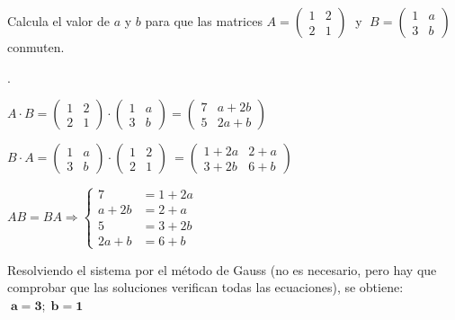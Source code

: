 \begin{ejre}
	Calcula el valor de $a$ y $b$ para que las matrices $A=\left( \begin{matrix} 1&2\\2&1 \end{matrix} \right)\; $ y $\; B=\left( \begin{matrix} 1&a\\3&b \end{matrix} \right)\;$ conmuten.
\end{ejre}
\begin{proofw}\renewcommand{\qedsymbol}{$\diamond$}.

\small{$A\cdot B=\left( \begin{matrix} 1&2\\2&1 \end{matrix} \right)\cdot \left( \begin{matrix} 1&a\\3&b \end{matrix} \right) =\left( \begin{matrix} 7&a+2b\\5&2a+b \end{matrix} \right)$}

\small{$B\cdot A= \left( \begin{matrix} 1&a\\3&b \end{matrix} \right)\cdot \left( \begin{matrix} 1&2\\2&1 \end{matrix} \right)\  =\left( \begin{matrix} 1+2a&2+a\\3+2b&6+b \end{matrix} \right)$}

\small{$AB=BA \Rightarrow \begin{cases} 7&=1+2a\\ a+2b&=2+a\\5&=3+2b\\2a+b&=6+b  \end{cases}$}

\normalsize{Resolviendo el sistema por el método de Gauss (no es necesario, pero hay que comprobar que las soluciones  verifican todas las ecuaciones), se obtiene: $\; \boldsymbol{a=3; \; b=1}$}

\end{proofw}

